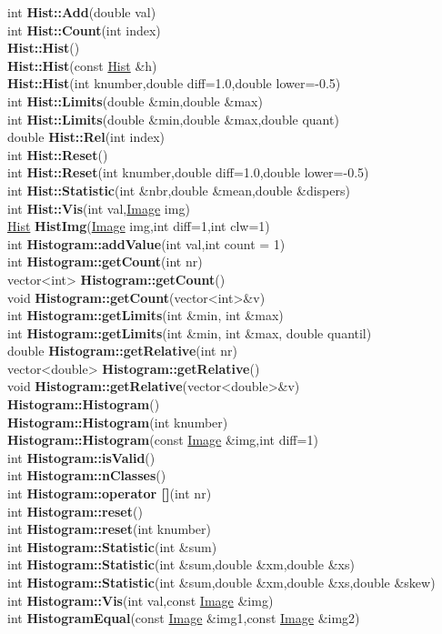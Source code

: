 \documentclass[10pt,titlepage]{article}
\def\functionlistentry#1#2#3#4#5#6{\noindent #1 {\bf #2}(#3) \dotfill #6\\}
\def\letterref#1{}
\def\letterlabelend#1{}
\begin{document}
{{\letterref{Ha}
\letterref{He}
\letterref{Hi}
\letterref{Hs}
\letterref{Hu}
\letterlabelend{Hi}
\functionlistentry{int}{Hist::Add}{double val}{908}{statistics}{}
\functionlistentry{int}{Hist::Count}{int index}{909}{statistics}{}
\functionlistentry{}{Hist::Hist}{}{903}{statistics}{}
\functionlistentry{}{Hist::Hist}{const \hyperlink{Hist}{Hist} \&h}{904}{statistics}{}
\functionlistentry{}{Hist::Hist}{int knumber,double diff=1.0,double lower=-0.5}{905}{statistics}{}
\functionlistentry{int}{Hist::Limits}{double \&min,double \&max}{911}{statistics}{}
\functionlistentry{int}{Hist::Limits}{double \&min,double \&max,double quant}{912}{statistics}{}
\functionlistentry{double}{Hist::Rel}{int index}{910}{statistics}{}
\functionlistentry{int}{Hist::Reset}{}{906}{statistics}{}
\functionlistentry{int}{Hist::Reset}{int knumber,double diff=1.0,double lower=-0.5}{907}{statistics}{}
\functionlistentry{int}{Hist::Statistic}{int \&nbr,double \&mean,double \&dispers}{914}{statistics}{}
\functionlistentry{int}{Hist::Vis}{int val,\hyperlink{Image}{Image} img}{916}{statistics}{}
\functionlistentry{\hyperlink{Hist}{Hist}}{HistImg}{\hyperlink{Image}{Image} img,int diff=1,int clw=1}{913}{statistics}{}
\functionlistentry{int}{Histogram::addValue}{int val,int count = 1}{887}{statistics}{}
\functionlistentry{int}{Histogram::getCount}{int nr}{888}{statistics}{}
\functionlistentry{vector\textless {}int\textgreater }{Histogram::getCount}{}{890}{statistics}{}
\functionlistentry{void}{Histogram::getCount}{vector\textless {}int\textgreater  \&v}{891}{statistics}{}
\functionlistentry{int}{Histogram::getLimits}{int \&min, int \&max}{895}{statistics}{}
\functionlistentry{int}{Histogram::getLimits}{int \&min, int \&max, double quantil}{896}{statistics}{}
\functionlistentry{double}{Histogram::getRelative}{int nr}{892}{statistics}{}
\functionlistentry{vector\textless {}double\textgreater }{Histogram::getRelative}{}{893}{statistics}{}
\functionlistentry{void}{Histogram::getRelative}{vector\textless {}double\textgreater  \&v}{894}{statistics}{}
\functionlistentry{}{Histogram::Histogram}{}{880}{statistics}{}
\functionlistentry{}{Histogram::Histogram}{int knumber}{881}{statistics}{}
\functionlistentry{}{Histogram::Histogram}{const \hyperlink{Image}{Image} \&img,int diff=1}{882}{statistics}{}
\functionlistentry{int}{Histogram::isValid}{}{885}{statistics}{}
\functionlistentry{int}{Histogram::nClasses}{}{886}{statistics}{}
\functionlistentry{int}{Histogram::operator []}{int nr}{889}{statistics}{}
\functionlistentry{int}{Histogram::reset}{}{883}{statistics}{}
\functionlistentry{int}{Histogram::reset}{int knumber}{884}{statistics}{}
\functionlistentry{int}{Histogram::Statistic}{int \&sum}{897}{statistics}{}
\functionlistentry{int}{Histogram::Statistic}{int \&sum,double \&xm,double \&xs}{898}{statistics}{}
\functionlistentry{int}{Histogram::Statistic}{int \&sum,double \&xm,double \&xs,double \&skew}{899}{statistics}{}
\functionlistentry{int}{Histogram::Vis}{int val,const \hyperlink{Image}{Image} \&img}{901}{statistics}{}
\functionlistentry{int}{HistogramEqual}{const \hyperlink{Image}{Image} \&img1,const \hyperlink{Image}{Image} \&img2}{1080}{processing}{}

}}
\end{document}
